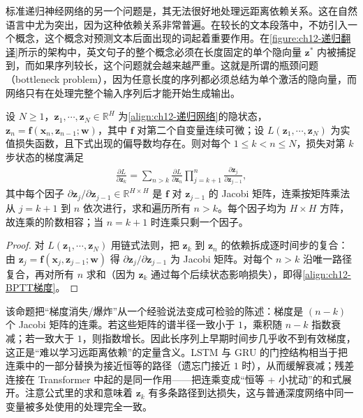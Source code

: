 \documentclass[../../main.tex]{subfiles}
\begin{document}
标准递归神经网络的另一个问题是，其无法很好地处理远距离依赖关系。这在自然语言中尤为突出，因为这种依赖关系非常普遍。在较长的文本段落中，不妨引入一个概念，这个概念对预测文本后面出现的词起着重要作用。在\cref{figure:ch12-递归翻译}所示的架构中，英文句子的整个概念必须在长度固定的单个隐向量 $\mathbf{z}^{*}$ 内被捕捉到，而如果序列较长，这个问题就会越来越严重。这就是所谓的瓶颈问题（bottleneck problem），因为任意长度的序列都必须总结为单个激活的隐向量，而网络只有在处理完整个输入序列后才能开始生成输出。

\begin{proposition}[通过时间反向传播的梯度连乘]\label{proposition:ch12-BPTT}
设 $N\geqslant1$，$\mathbf{z}_1,\cdots,\mathbf{z}_N\in\mathbb{R}^{H}$ 为\eqref{align:ch12-递归网络}的隐状态，$\mathbf{z}_n=\mathbf{f}(\mathbf{x}_n,\mathbf{z}_{n-1};\mathbf{w})$，其中 $\mathbf{f}$ 对第二个自变量连续可微；设 $L(\mathbf{z}_1,\cdots,\mathbf{z}_N)$ 为实值损失函数，且下式出现的偏导数均存在。则对每个 $1\leqslant k<n\leqslant N$，损失对第 $k$ 步状态的梯度满足
\begin{align}
\frac{\partial L}{\partial\mathbf{z}_{k}}=\sum_{n>k}\frac{\partial L}{\partial\mathbf{z}_{n}}\prod_{j=k+1}^{n}\frac{\partial\mathbf{z}_{j}}{\partial\mathbf{z}_{j-1}},
\label{align:ch12-BPTT梯度}
\end{align}
其中每个因子 $\partial\mathbf{z}_{j}/\partial\mathbf{z}_{j-1}\in\mathbb{R}^{H\times H}$ 是 $\mathbf{f}$ 对 $\mathbf{z}_{j-1}$ 的 Jacobi 矩阵，连乘按矩阵乘法从 $j=k+1$ 到 $n$ 依次进行，求和遍历所有 $n>k$。每个因子均为 $H\times H$ 方阵，故连乘的阶数相容；当 $n=k+1$ 时连乘只剩一个因子。
\end{proposition}

\begin{proof}
对 $L(\mathbf{z}_1,\cdots,\mathbf{z}_N)$ 用链式法则，把 $\mathbf{z}_k$ 到 $\mathbf{z}_n$ 的依赖拆成逐时间步的复合：由 $\mathbf{z}_{j}=\mathbf{f}(\mathbf{x}_j,\mathbf{z}_{j-1};\mathbf{w})$ 得 $\partial\mathbf{z}_{j}/\partial\mathbf{z}_{j-1}$ 为 Jacobi 矩阵。对每个 $n>k$ 沿唯一路径复合，再对所有 $n$ 求和（因为 $\mathbf{z}_k$ 通过每个后续状态影响损失），即得\eqref{align:ch12-BPTT梯度}。
\end{proof}

\begin{remark}
该命题把“梯度消失/爆炸”从一个经验说法变成可检验的陈述：梯度是 $(n-k)$ 个 Jacobi 矩阵的连乘。若这些矩阵的谱半径一致小于 $1$，乘积随 $n-k$ 指数衰减；若一致大于 $1$，则指数增长。因此长序列上早期时间步几乎收不到有效梯度，这正是“难以学习远距离依赖”的定量含义。LSTM 与 GRU 的门控结构相当于把连乘中的一部分替换为接近恒等的路径（遗忘门接近 $1$ 时），从而缓解衰减；残差连接在 Transformer 中起的是同一作用——把连乘变成“恒等 + 小扰动”的和式展开。注意公式里的求和意味着 $\mathbf{z}_k$ 有多条路径到达损失，这与普通深度网络中同一变量被多处使用的处理完全一致。
\end{remark}
\end{document}
